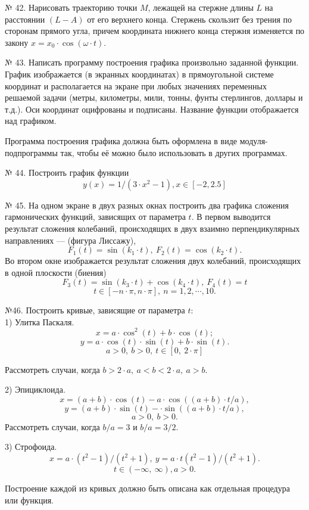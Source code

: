 № 42. Нарисовать траекторию точки $M$, лежащей на стержне длины $L$ на расстоянии $(L- A)$ от его верхнего конца. Стержень скользит без трения по сторонам прямого угла, причем координата нижнего конца стержня изменяется по закону $x = x_0\cdot\cos(\omega\cdot t)$.

№ 43. Написать программу построения графика произвольно заданной функции. График изображается (в экранных координатах) в прямоугольной системе координат и располагается на экране при любых значениях переменных решаемой задачи (метры, километры, мили, тонны, фунты стерлингов, доллары и т.д.). Оси координат оцифрованы и подписаны. Название функции отображается над графиком.

Программа построения графика должна быть оформлена в виде модуля-подпрограммы так, чтобы её можно было использовать в других программах.

№ 44. Построить график функции
$$y(x)= 1/(3\cdot x^2-1), x \in[-2,2.5]$$

№ 45. На одном экране в двух разных окнах построить два графика сложения гармонических функций, зависящих от параметра $t$. В первом выводится результат сложения колебаний, происходящих в двух взаимно перпендикулярных направлениях --- (фигура Лиссажу),
$$F_1(t) = \sin(k_1\cdot t), \:F_2(t) = \cos(k_2\cdot t).$$
Во втором окне изображается результат сложения двух колебаний, происходящих в одной плоскости (биения)
$$F_3(t) = \sin(k_3\cdot t) + \cos(k_4\cdot t), \:F_4(t) = t$$
$$t\in [-n\cdot \pi, n\cdot \pi], \:n = 1,2,\cdots, 10.  $$

№46. Построить кривые, зависящие от параметра $t:$\\

 1) Улитка Паскаля.\\
$$x = a\cdot \cos^2(t) + b\cdot \cos(t);$$
$$ y = a\cdot \cos(t)\cdot\sin(t) + b\cdot\sin(t).$$
$$a > 0, \:b > 0,\: t \in[0,\:2\cdot \pi]$$

Рассмотреть случаи, когда $b > 2\cdot a, \: a < b < 2\cdot a, \: a > b.$

2) Эпициклоида.\\
$$x = (a + b)\cdot\cos(t) - a\cdot\cos((a + b)\cdot t / a),$$
$$y = (a + b)\cdot\sin(t) - \cdot\sin((a + b)\cdot t / a), $$
$$a > 0,\: b > 0.$$
Рассмотреть случаи, когда $b / a = 3$ и $b / a = 3 / 2.$

3) Строфоида.\\
$$x = a\cdot(t^2 -1)/(t^2 + 1), \:y = a\cdot t(t^2-1) / (t^2 +1).$$
$$ t \in (-\infty ,\:\infty),  a > 0.$$

Построение каждой из кривых должно быть описана как отдельная процедура или функция.


